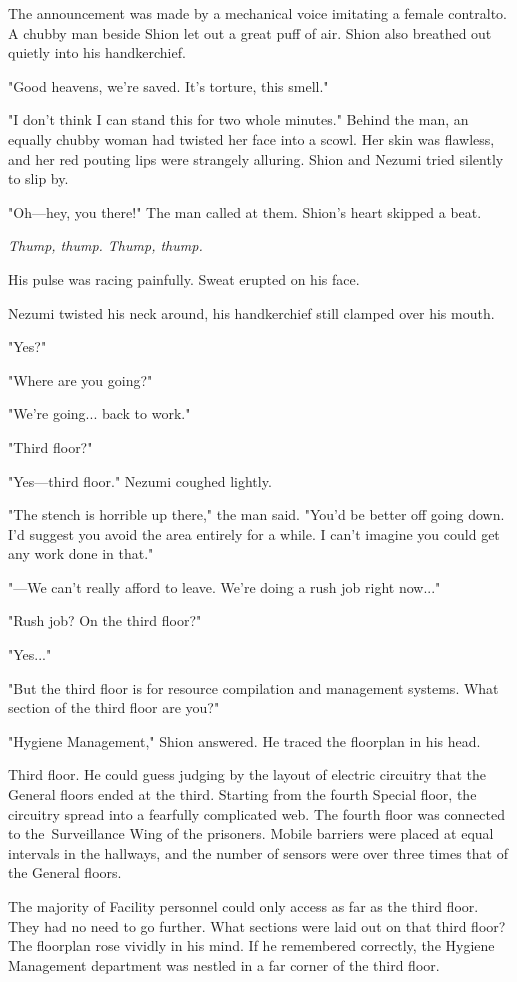 The announcement was made by a mechanical voice imitating a female
contralto. A chubby man beside Shion let out a great puff of air. Shion
also breathed out quietly into his handkerchief.

"Good heavens, we're saved. It's torture, this smell."

"I don't think I can stand this for two whole minutes." Behind the man,
an equally chubby woman had twisted her face into a scowl. Her skin was
flawless, and her red pouting lips were strangely alluring. Shion and
Nezumi tried silently to slip by.

"Oh---hey, you there!" The man called at them. Shion's heart skipped a
beat.

\emph{Thump, thump. Thump, thump.}

His pulse was racing painfully. Sweat erupted on his face.

Nezumi twisted his neck around, his handkerchief still clamped over his
mouth.

"Yes?"

"Where are you going?"

"We're going... back to work."

"Third floor?"

"Yes---third floor." Nezumi coughed lightly.

"The stench is horrible up there," the man said. "You'd be better off
going down. I'd suggest you avoid the area entirely for a while. I can't
imagine you could get any work done in that."

"---We can't really afford to leave. We're doing a rush job right now..."

"Rush job? On the third floor?"

"Yes..."

"But the third floor is for resource compilation and management systems.
What section of the third floor are you?"

"Hygiene Management," Shion answered. He traced the floorplan in his
head.

Third floor. He could guess judging by the layout of electric circuitry
that the General floors ended at the third. Starting from the fourth
Special floor, the circuitry spread into a fearfully complicated web.
The fourth floor was connected to the~Surveillance Wing of the
prisoners. Mobile barriers were placed at equal intervals in the
hallways, and the number of sensors were over three times that of the
General floors.

The majority of Facility personnel could only access as far as the third
floor. They had no need to go further. What sections were laid out on
that third floor? The floorplan rose vividly in his mind. If he
remembered correctly, the Hygiene Management department was nestled in a
far corner of the third floor.

